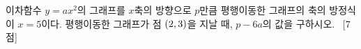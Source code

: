 이차함수 $y=ax^2$의 그래프를 $x$축의 방향으로 $p$만큼 평행이동한 그래프의 축의 방정식이 $x=5$이다. 평행이동한 그래프가 점 $(2{,}\mkern3mu\mathopen{}3)$을 지날 때, $p-6a$의 값을 구하시오. ~\mbox{\mbox{[7점]}}
